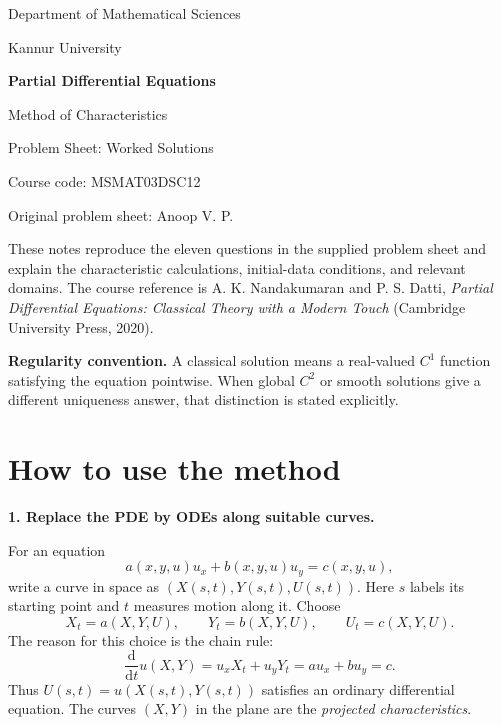 \documentclass[11pt,a4paper]{article}
\newcommand{\step}[1]{\par\medskip\textbf{#1}\par}
\begin{document}
\hypersetup{pageanchor=false}
\begin{titlepage}
\thispagestyle{fancy}
\centering
\vspace*{20mm}
{\Large Department of Mathematical Sciences\par}
{\large Kannur University\par}
\vspace{22mm}
{\Huge\bfseries Partial Differential Equations\par}
\vspace{8mm}
{\LARGE Method of Characteristics\par}
\vspace{8mm}
{\Large Problem Sheet: Worked Solutions\par}
\vspace{15mm}
{\large Course code: MSMAT03DSC12\par}
{\large Original problem sheet: Anoop V. P.\par}
\vfill
\begin{minipage}{.9\textwidth}
These notes reproduce the eleven questions in the supplied problem sheet and explain the characteristic calculations, initial-data conditions, and relevant domains. The course reference is A. K. Nandakumaran and P. S. Datti, \emph{Partial Differential Equations: Classical Theory with a Modern Touch} (Cambridge University Press, 2020).

\textbf{Regularity convention.} A classical solution means a real-valued $C^1$ function satisfying the equation pointwise. When global $C^2$ or smooth solutions give a different uniqueness answer, that distinction is stated explicitly.
\end{minipage}
\vspace{15mm}
\end{titlepage}
\hypersetup{pageanchor=true}
\tableofcontents
\clearpage
\section*{How to use the method}
\step{1. Replace the PDE by ODEs along suitable curves.}
For an equation
\[
 a(x,y,u)u_x+b(x,y,u)u_y=c(x,y,u),
\]
write a curve in space as $(X(s,t),Y(s,t),U(s,t))$. Here $s$ labels its starting point and $t$ measures motion along it. Choose
\[
 X_t=a(X,Y,U),\qquad Y_t=b(X,Y,U),\qquad U_t=c(X,Y,U).
\]
The reason for this choice is the chain rule:
\[
 \frac{\mathrm d}{\mathrm dt}u(X,Y)=u_xX_t+u_yY_t=au_x+bu_y=c.
\]
Thus $U(s,t)=u(X(s,t),Y(s,t))$ satisfies an ordinary differential equation. The curves $(X,Y)$ in the plane are the \emph{projected characteristics}.
\end{document}
